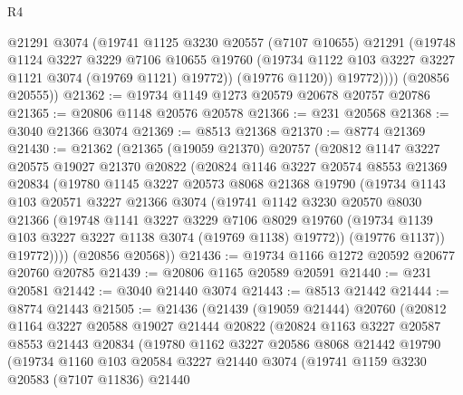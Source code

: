 \begin{lexlean}{R4}
\begin{coremodule}
              @21291
              @3074
              (@19741
                @1125
                @3230
                @20557
                (@7107 @10655)
                @21291
                (@19748
                  @1124
                  @3227
                  @3229
                  @7106
                  @10655
                  @19760
                  (@19734 @1122 @103 @3227 @3227 @1121 @3074 (@19769 @1121) @19772))
                (@19776 @1120))
              @19772))))
      (@20856 @20555))
@21362 := @19734 @1149 @1273 @20579 @20678 @20757 @20786
@21365 := @20806 @1148 @20576 @20578
@21366 := @231 @20568
@21368 := @3040 @21366 @3074
@21369 := @8513 @21368
@21370 := @8774 @21369
@21430 := @21362
    (@21365
      (@19059 @21370)
      @20757
      (@20812
        @1147
        @3227
        @20575
        @19027
        @21370
        @20822
        (@20824
          @1146
          @3227
          @20574
          @8553
          @21369
          @20834
          (@19780
            @1145
            @3227
            @20573
            @8068
            @21368
            @19790
            (@19734
              @1143
              @103
              @20571
              @3227
              @21366
              @3074
              (@19741
                @1142
                @3230
                @20570
                @8030
                @21366
                (@19748
                  @1141
                  @3227
                  @3229
                  @7106
                  @8029
                  @19760
                  (@19734 @1139 @103 @3227 @3227 @1138 @3074 (@19769 @1138) @19772))
                (@19776 @1137))
              @19772))))
      (@20856 @20568))
@21436 := @19734 @1166 @1272 @20592 @20677 @20760 @20785
@21439 := @20806 @1165 @20589 @20591
@21440 := @231 @20581
@21442 := @3040 @21440 @3074
@21443 := @8513 @21442
@21444 := @8774 @21443
@21505 := @21436
    (@21439
      (@19059 @21444)
      @20760
      (@20812
        @1164
        @3227
        @20588
        @19027
        @21444
        @20822
        (@20824
          @1163
          @3227
          @20587
          @8553
          @21443
          @20834
          (@19780
            @1162
            @3227
            @20586
            @8068
            @21442
            @19790
            (@19734
              @1160
              @103
              @20584
              @3227
              @21440
              @3074
              (@19741
                @1159
                @3230
                @20583
                (@7107 @11836)
                @21440

\end{coremodule}
\end{lexlean}
